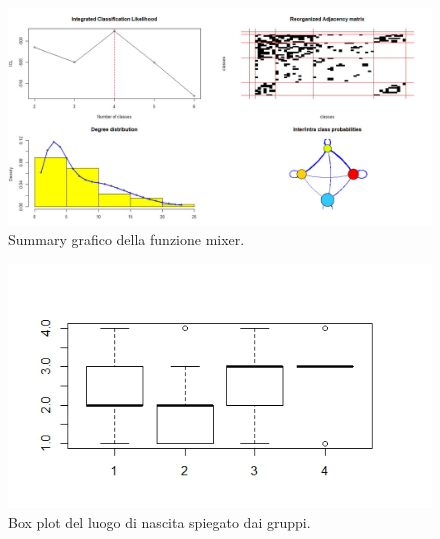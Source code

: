 \documentclass[11pt,a4paper]{report}
\begin{document}
\\
\begin{figure}[H]
	\centering
	\includegraphics[scale=0.5]{Rplot}
	\caption{Summary grafico della funzione mixer.}
\end{figure}
\begin{figure}[H]
	\centering
	\includegraphics[scale=0.75]{boxplot}
	\caption{Box plot del luogo di nascita spiegato dai gruppi.}
\end{figure}
 
\end{document}
